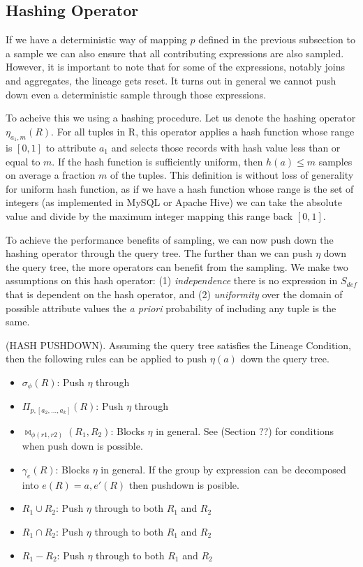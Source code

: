\subsection{Hashing Operator}
If we have a deterministic way of mapping $p$ defined in the previous subsection to a sample we can also ensure that all contributing expressions are also sampled. 
However, it is important to note that for some of the expressions, notably joins and aggregates, the lineage gets reset.
It turns out in general we cannot push down even a deterministic sample through those expressions.

To acheive this we using a hashing procedure.
Let us denote the hashing operator $\eta_{a_1, m}(R)$. 
For all tuples in R, this operator applies a hash function whose range is $[0,1]$ to attribute $a_1$ and selects those records with hash value less than or equal to $m$.
If the hash function is sufficiently uniform, then $h(a) \le m$ samples on average a fraction $m$ of the tuples.
This definition is without loss of generality for uniform hash function, as if we have a hash function whose range is the set of integers (as implemented in MySQL or Apache Hive) we can take the absolute value and divide by the maximum integer mapping this range back $[0,1]$. 

To achieve the performance benefits of sampling, we can now push down the hashing operator through the query tree.
The further than we can push $\eta$ down the query tree, the more operators can benefit from the sampling.
We make two assumptions on this hash operator: (1) \emph{independence} there is no expression in $S_{def}$ that is dependent on the hash operator, and (2) \emph{uniformity} over the domain of possible attribute values the \emph{a priori} probability of including any tuple is the same.

\begin{proposition}
(HASH PUSHDOWN). Assuming the query tree satisfies the Lineage Condition, then the following rules can be applied to push $\eta(a)$ down the query tree. 
\begin{itemize}\vspace{-.45em}
\item $\sigma_{\phi}(R)$: Push $\eta$ through \vspace{-.45em}
\item $\Pi_{p,[a_2,...,a_k]}(R)$: Push $\eta $ through \vspace{-.45em}
\item $\bowtie_{\phi (r1,r2)}(R_1,R_2)$: Blocks $\eta $ in general. See (Section ??) for conditions when push down is possible.
\item $\gamma_{e}(R)$: Blocks $\eta$ in general. If the group by expression can be decomposed into $e(R) = a, e'(R)$ then pushdown is posible.\vspace{-.45em}
\item $R_1 \cup R_2$: Push $\eta $ through to both $R_1$ and $R_2$
\item $R_1 \cap R_2$: Push $\eta $ through to both $R_1$ and $R_2$
\item $R_1 - R_2$: Push $\eta $ through to both $R_1$ and $R_2$
\end{itemize}
\end{proposition}

